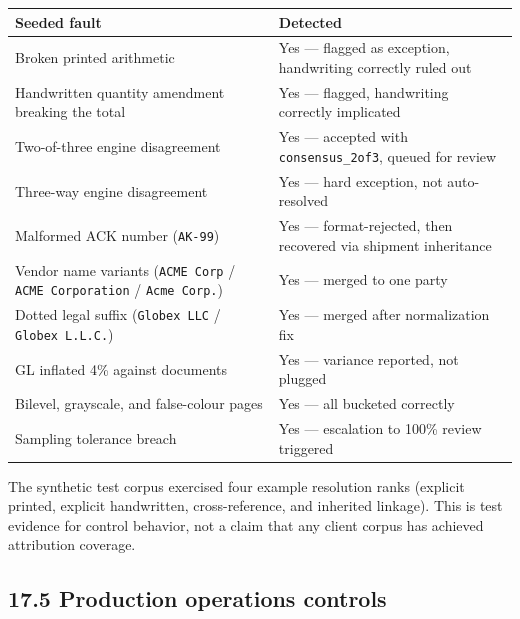 \documentclass[
]{article}
\newcounter{none} %
\begin{document}
{\def\LTcaptype{none} %
\begin{longtable}[]{@{}
  >{\raggedright\arraybackslash}p{}
  >{\raggedright\arraybackslash}p{}@{}}
\toprule\noalign{}
\begin{minipage}[b]{\linewidth}\raggedright
Seeded fault
\end{minipage} & \begin{minipage}[b]{\linewidth}\raggedright
Detected
\end{minipage} \\
\midrule\noalign{}
\endhead
\bottomrule\noalign{}
\endlastfoot
Broken printed arithmetic & Yes --- flagged as exception, handwriting
correctly ruled out \\
Handwritten quantity amendment breaking the total & Yes --- flagged,
handwriting correctly implicated \\
Two-of-three engine disagreement & Yes --- accepted with
\texttt{consensus\_\allowbreak{}2of3}, queued for review \\
Three-way engine disagreement & Yes --- hard exception, not
auto-resolved \\
Malformed ACK number (\texttt{AK-99}) & Yes --- format-rejected, then
recovered via shipment inheritance \\
Vendor name variants (\texttt{ACME\ Corp} / \texttt{ACME\ Corporation} /
\texttt{Acme\ Corp.}) & Yes --- merged to one party \\
Dotted legal suffix (\texttt{Globex\ LLC} / \texttt{Globex\ L.L.C.}) &
Yes --- merged after normalization fix \\
GL inflated 4\% against documents & Yes --- variance reported, not
plugged \\
Bilevel, grayscale, and false-colour pages & Yes --- all bucketed
correctly \\
Sampling tolerance breach & Yes --- escalation to 100\% review
triggered \\
\end{longtable}
}

The synthetic test corpus exercised four example resolution ranks
(explicit printed, explicit handwritten, cross-reference, and inherited
linkage). This is test evidence for control behavior, not a claim that
any client corpus has achieved attribution coverage.

\subsection{17.5 Production operations
controls}\label{production-operations-controls}
\end{document}
